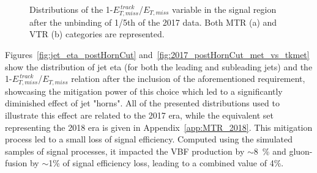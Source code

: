 \begin{figure}[htbp]
  \centering
  \caption{Distributions of the 1-$E_{T,miss}^{~track}$/$E_{T, miss}$ variable in the signal region after the unbinding of 1/5th of the 2017 data. Both MTR (a) and VTR (b) categories are represented.}
  \label{fig:met_vs_tkmet_2017}
\end{figure}
\hspace{10pt} Figures~\ref{fig:jet_eta_postHornCut} and~\ref{fig:2017_postHornCut_met_vs_tkmet} show the distribution of jet eta (for both the leading and subleading jets) and the 1-$E_{T,miss}^{~track}$/$E_{T, miss}$ relation after the inclusion of the aforementioned requirement, showcasing the mitigation power of this choice which led to a significantly diminished effect of jet "horns". All of the presented distributions used to illustrate this effect are related to the 2017 era, while the equivalent set representing the 2018 era is given in Appendix~\ref{app:MTR_2018}. This mitigation process led to a small loss of signal efficiency. Computed using the simulated samples of signal processes, it impacted the VBF production by $\sim$8~\% and gluon-fusion by $\sim$1\% of signal efficiency loss, leading to a combined value of 4\%.

